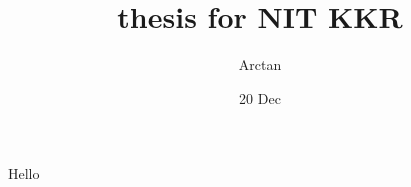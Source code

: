 \documentclass{report}
\title{thesis for \Large{NIT KKR}}
\author{Arctan}
\date{20 Dec}
\begin{document}
\maketitle    
Hello
\end{document}
